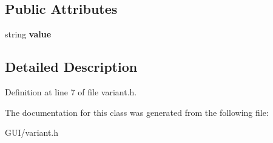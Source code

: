 \subsection*{Public Attributes}
\begin{DoxyCompactItemize}
\item 
\mbox{\label{classvariant_a55fb28f5fc28aebbbf1cc5281d7f4e2f}} 
string {\bfseries value}
\end{DoxyCompactItemize}


\subsection{Detailed Description}


Definition at line 7 of file variant.\+h.



The documentation for this class was generated from the following file\+:\begin{DoxyCompactItemize}
\item 
G\+U\+I/variant.\+h\end{DoxyCompactItemize}
